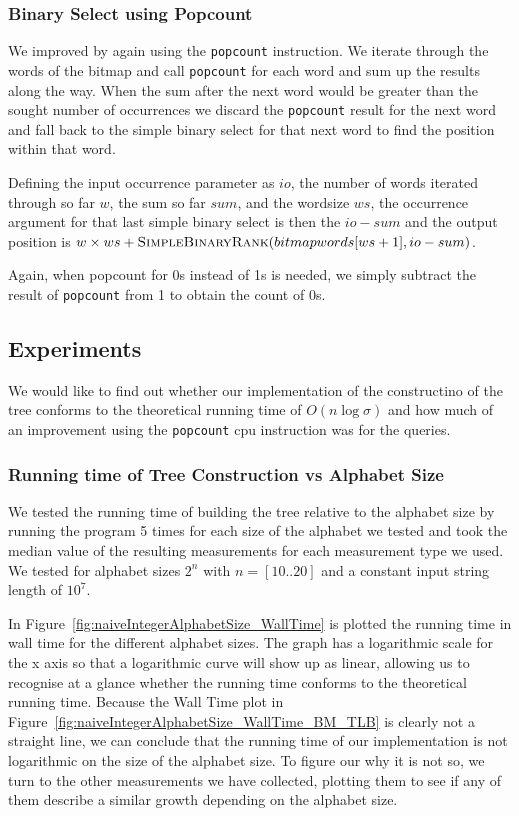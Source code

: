 \subsubsection{Binary Select using Popcount}
\label{sec:ImplBinarySelect}
We improved  by again using the \texttt{popcount} instruction. 
We iterate through the words of the bitmap and call \texttt{popcount} for each word and sum up the results along the way. 
When the sum after the next word would be greater than the sought number of occurrences we discard the \texttt{popcount} result for the next word and fall back to the simple binary select for that next word to find the position within that word.

Defining the input occurrence parameter as $io$, the number of words iterated through so far $w$, the sum so far $sum$, and the wordsize $ws$, the occurrence argument for that last simple binary select is then the $io - sum$ and the output position is $w \times ws + \textproc{SimpleBinaryRank}(bitmapwords[ws+1], io - sum)$.

Again, when popcount for 0s instead of 1s is needed, we simply subtract the result of \texttt{popcount} from 1 to obtain the count of 0s.

\subsection{Experiments}
We would like to find out whether our implementation of the constructino of the tree conforms to the theoretical running time of $O(n \log \sigma)$ and how much of an improvement using the \texttt{popcount} cpu instruction was for the queries.


\subsubsection{Running time of Tree Construction vs Alphabet Size}
We tested the running time of building the tree relative to the alphabet size by running the program 5 times for each size of the alphabet we tested and took the median value of the resulting measurements for each measurement type we used.
We tested for alphabet sizes $2^n$ with $n = [10..20]$ and a constant input string length of $10^7$.

In Figure~\ref{fig:naiveIntegerAlphabetSize_WallTime} is plotted the running time in wall time for the different alphabet sizes. The graph has a logarithmic scale for the x axis so that a logarithmic curve will show up as linear, allowing us to recognise at a glance whether the running time conforms to the theoretical running time.
Because the Wall Time plot in Figure~\ref{fig:naiveIntegerAlphabetSize_WallTime_BM_TLB} is clearly not a straight line, we can conclude that the running time of our implementation is not logarithmic on the size of the alphabet size.
To figure our why it is not so, we turn to the other measurements we have collected, plotting them to see if any of them describe a similar growth depending on the alphabet size.


